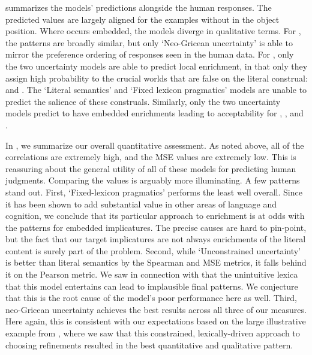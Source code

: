 \documentclass[leqno,12pt]{article}
\begin{document}
 summarizes the models' predictions alongside
the human responses. The predicted values are largely aligned for the
examples without  in the object position. Where 
occurs embedded, the models diverge in qualitative terms. For
, the patterns are broadly similar, but only
`Neo-Gricean uncertainty' is able to mirror the preference ordering of
responses seen in the human data. For , only
the two uncertainty models are able to predict local enrichment, in
that only they assign high probability to the crucial worlds that are
false on the literal construal:  and . The
`Literal semantics' and `Fixed lexicon pragmatics' models are unable
to predict the salience of these construals. Similarly, only the two
uncertainty models predict  to have embedded
enrichments leading to acceptability for , , and
.


In , we summarize our overall quantitative
assessment. As noted above, all of the correlations are extremely
high, and the MSE values are extremely low. This is reassuring about
the general utility of all of these models for predicting human
judgments. Comparing the values is arguably more illuminating. A few
patterns stand out.  First, `Fixed-lexicon pragmatics' performs the
least well overall.  Since it has been shown to add substantial value
in other areas of language and cognition, we conclude that its
particular approach to enrichment is at odds with the patterns for
embedded implicatures.  The precise causes are hard to pin-point, but
the fact that our target implicatures are not always enrichments of
the literal content is surely part of the problem.  Second, while
`Unconstrained uncertainty' is better than literal semantics by the
Spearman and MSE metrics, it falls behind it on the Pearson metric. We
saw in connection with  that the unintuitive
lexica that this model entertains can lead to implausible final
patterns. We conjecture that this is the root cause of the model's
poor performance here as well.  Third, neo-Gricean uncertainty
achieves the best results across all three of our measures. Here
again, this is consistent with our expectations based on the large
illustrative example from , where we saw
that this constrained, lexically-driven approach to choosing
refinements resulted in the best quantitative and qualitative pattern.
\end{document}
